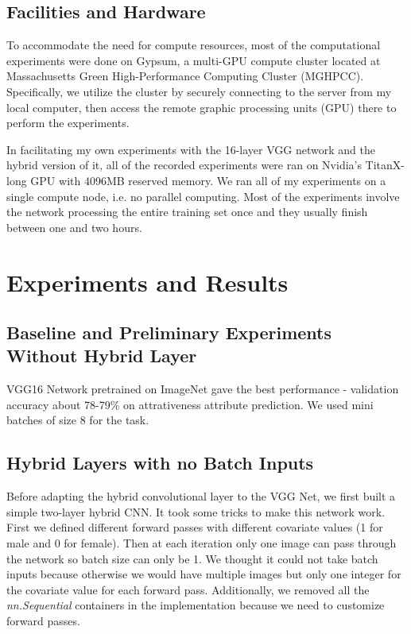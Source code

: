 \documentclass[12pt]{article}
\begin{document}
\subsection{Facilities and Hardware}
To accommodate the need for compute resources, most of the computational experiments were done on Gypsum, a multi-GPU compute cluster located at Massachusetts Green High-Performance Computing Cluster (MGHPCC). Specifically, we utilize the cluster by securely connecting to the server from my local computer, then access the remote graphic processing units (GPU) there to perform the experiments. 

In facilitating my own experiments with the 16-layer VGG network and the hybrid version of it, all of the recorded experiments were ran on Nvidia's TitanX-long GPU with 4096MB reserved memory. We ran all of my experiments on a single compute node, i.e. no parallel computing. Most of the experiments involve the network processing the entire training set once and they usually finish between one and two hours. 


\section{Experiments and Results}

\subsection{Baseline and Preliminary Experiments Without Hybrid Layer}

VGG16 Network pretrained on ImageNet gave the best performance - validation accuracy about 78-79\% on attrativeness attribute prediction. We used mini batches of size 8 for the task.

\subsection{Hybrid Layers with no Batch Inputs}
Before adapting the hybrid convolutional layer to the VGG Net, we first built a simple two-layer hybrid CNN. It took some tricks to make this network work. First we defined different forward passes with different covariate values (1 for male and 0 for female). Then at each iteration only one image can pass through the network so batch size can only be 1. We thought it could not take batch inputs because otherwise we would have multiple images but only one integer for the covariate value for each forward pass. Additionally, we removed all the \textit{nn.Sequential} containers in the implementation because we need to customize forward passes. 
\end{document}
